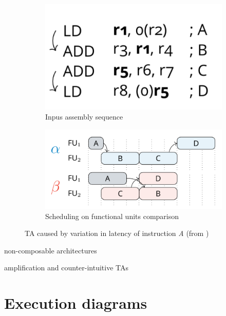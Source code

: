 \begin{figure}[htbp]
    \centering
    \begin{subfigure}[t]{0.3\textwidth}
        \centering
        \includegraphics[width=\textwidth]{figures/first-TA-ex-input.png}
        \caption{Inpus assembly sequence}
        \label{fig:TA1-code}
    \end{subfigure}
    \hfill
    \begin{subfigure}[t]{0.55\textwidth}
        \centering
        \includegraphics[width=\textwidth]{figures/first-TA-ex-trace.png}
        \caption{Scheduling on functional units comparison}
        \label{fig:TA1-trace}
    \end{subfigure}
    \caption{TA caused by variation in latency of instruction \textit{A} (from \cite{binder_definitions_2022})}
    \label{fig:TA1}
\end{figure}

non-composable architectures

amplification and counter-intuitive TAs

\section{Execution diagrams}

